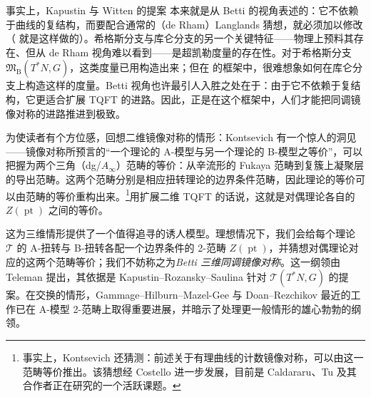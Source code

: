 事实上，Kapustin 与 Witten 的提案 \cite{kapustinElectricmagneticDuality2007} 本来就是从 Betti 的视角表述的：它不依赖于曲线的复结构，而要配合通常的（de Rham）Langlands 猜想，就必须加以修改（\cite{elliottGeometricLanglands2018} 就是这样做的）。希格斯分支与库仑分支的另一个关键特征——物理上预料其存在、但从 de Rham 视角难以看到——是超凯勒度量的存在性。对于希格斯分支 $\mathfrak{M}_{\operatorname{B}}(T^*N,G)$，这类度量已用构造出来；但在 \cite{BFN} 的框架中，很难想象如何在库仑分支上构造这样的度量。Betti 视角也许最引人入胜之处在于：由于它不依赖于复结构，它更适合扩展 TQFT 的进路。因此，正是在这个框架中，人们才能把同调镜像对称的进路推进到极致。

为使读者有个方位感，回想二维镜像对称的情形：Kontsevich 有一个惊人的洞见——镜像对称所预言的“一个理论的 A-模型与另一个理论的 B-模型之等价”，可以把握为两个三角（dg/$A_{\infty}$）范畴的等价：从辛流形的 Fukaya 范畴到复簇上凝聚层的导出范畴。这两个范畴分别是相应扭转理论的边界条件范畴，因此理论的等价可以由范畴的等价重构出来。\footnote{事实上，Kontsevich 还猜测：前述关于有理曲线的计数镜像对称，可以由这一范畴等价推出。该猜想经 Costello 进一步发展，目前是 Caldararu、Tu 及其合作者正在研究的一个活跃课题。}用扩展二维 TQFT 的话说，这就是对偶理论各自的 $Z(\operatorname{pt})$ 之间的等价。

这为三维情形提供了一个值得追寻的诱人模型。理想情况下，我们会给每个理论 $\mathcal{T}$ 的 A-扭转与 B-扭转各配一个边界条件的 2-范畴 $Z(\operatorname{pt})$，并猜想对偶理论对应的这两个范畴等价；我们不妨称之为\emph{Betti 三维同调镜像对称}。这一纲领由 Teleman \cite{telemanGaugeTheory2014} 提出，其依据是 Kapustin–Rozansky–Saulina \cite{kapustinThreedimensionalTopological2009} 针对 $\mathcal{T}(T^*N,G)$ 的提案。在交换的情形，Gammage–Hilburn–Mazel-Gee \cite{gammagePerverseSchobers2022} 与 Doan–Rezchikov \cite{DoanRezchikov2022} 最近的工作已在 A-模型 2-范畴上取得重要进展，并暗示了处理更一般情形的雄心勃勃的纲领。

